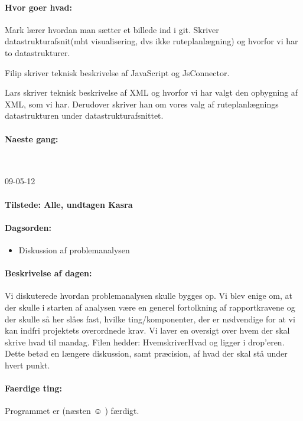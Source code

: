 \documentclass[a4paper,10pt,titlepage]{article}
\begin{document}
		\paragraph{Hvor goer hvad:}
		Mark lærer hvordan man sætter et billede ind i git. Skriver datastrukturafsnit(mht visualisering, dvs ikke ruteplanlægning) og hvorfor vi har to datastrukturer.

Filip skriver teknisk beskrivelse af JavaScript og JsConnector.

Lars skriver teknisk beskrivelse af XML og hvorfor vi har valgt den opbygning af XML, som vi har. Derudover skriver han om vores valg af ruteplanlægnings datastrukturen under datastrukturafsnittet.

		\paragraph{Naeste gang:}\mbox{}\\
		
		\begin{center}
		09-05-12
		\end{center}
		
		\paragraph{Tilstede: Alle, undtagen Kasra}
		\paragraph{Dagsorden:}
		\begin{itemize}
					\item Diskussion af problemanalysen
		\end{itemize}
		
		\paragraph{Beskrivelse af dagen:}
		Vi diskuterede hvordan problemanalysen skulle bygges op.  Vi blev enige om, at der skulle i starten af analysen være en generel fortolkning af rapportkravene og der skulle så her slåes fast, hvilke ting/komponenter, der er nødvendige for at vi kan indfri projektets overordnede krav. 
Vi laver en oversigt over hvem der skal skrive hvad til mandag. Filen hedder: HvemskriverHvad og ligger i drop’eren. Dette betød en længere diskussion, samt præcision, af hvad der skal stå under hvert punkt. 

		\paragraph{Faerdige ting:}
		Programmet er (næsten ☺ ) færdigt. 
\end{document}
